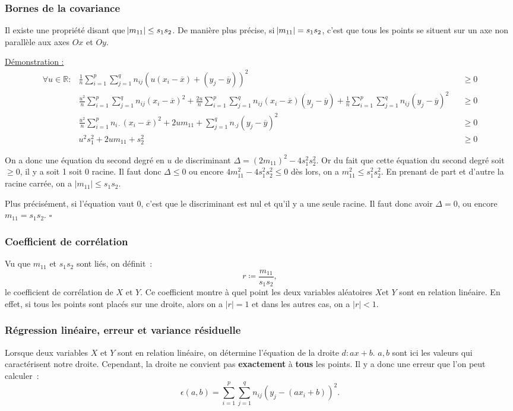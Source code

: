 \documentclass{article}
\begin{document}
		\subsubsection{Bornes de la covariance}
			Il existe une propriété disant que $\abs {m_{11}} \leq s_1s_2$. De manière plus précise, si $\abs {m_{11}} = s_1s_2$, c'est que tous les points se situent
			sur un axe non parallèle aux axes $Ox$ et $Oy$.

			\underline{Démonstration :}
			\begin{align*}
				\forall u \in \mathbb R : &\frac 1n\sum_{i=1}^p\sum_{j=1}^qn_{ij}(u(x_i-\overline x) + (y_j-\overline y))^2 &&\geq 0 \\
				&\frac {u^2}n\sum_{i=1}^p\sum_{j=1}^qn_{ij}(x_i-\overline x)^2 + \frac {2u}n\sum_{i=1}^p\sum_{j=1}^qn_{ij}(x_i-\overline x)(y_j-\overline y)
					+ \frac 1n\sum_{i=1}^p\sum_{j=1}^qn_{ij}(y_j-\overline y)^2 &&\geq 0 \\
				& \frac {u^2}n\sum_{i=1}^pn_{i\cdot}(x_i-\overline x)^2 + 2u m_{11} + \sum_{j=1}^qn_{\cdot j}(y_j-\overline y)^2 &&\geq 0 \\
				&u^2s_1^2 + 2um_{11} + s_2^2 &&\geq 0
			\end{align*}

			On a donc une équation du second degré en $u$ de discriminant $\Delta = (2m_{11})^2 - 4s_1^2s_2^2$. Or du fait que cette équation du second degré soit
			$\geq 0$, il y a soit 1 soit 0 racine. Il faut donc $\Delta \leq 0$ ou encore $4m_{11}^2 - 4s_1^2s_2^2\leq 0$ dès lors, on a $m_{11}^2 \leq s_1^2s_2^2$.
			En prenant de part et d'autre la racine carrée, on a $|m_{11}| \leq s_1s_2$.

			Plus précisément, si l'équation vaut 0, c'est que le discriminant est nul et qu'il y a une seule racine. Il faut donc avoir $\Delta = 0$, ou encore
			$m_{11} = s_1s_2$. $\square$

		\subsubsection{Coefficient de corrélation}
			Vu que $m_{11}$ et $s_1s_2$ sont liés, on définit~:
			\[r \coloneqq \frac {m_{11}}{s_1s_2},\]
			le coefficient de corrélation de $X$ et $Y$. Ce coefficient montre à quel point les deux variables aléatoires $X$et $Y$ sont en relation linéaire. En effet,
			si tous les points sont placés sur une droite, alors on a $|r| = 1$ et dans les autres cas, on a $|r| < 1$.

		\subsubsection{Régression linéaire, erreur et variance résiduelle}
			Lorsque deux variables $X$ et $Y$ sont en relation linéaire, on détermine l'équation de la droite $d : ax + b$. $a, b$ sont ici les valeurs qui caractérisent
			notre droite. Cependant, la droite ne convient pas \textbf{exactement} à \textbf{tous} les points. Il y a donc une erreur que l'on peut calculer~:
			\[\epsilon(a, b) = \sum_{i=1}^p\sum_{j=1}^qn_{ij}(y_j - (ax_i+b))^2.\]
\end{document}
